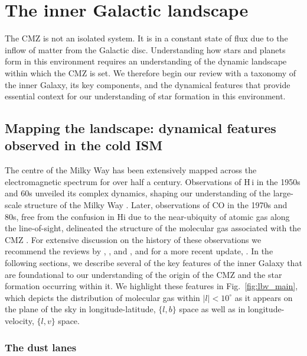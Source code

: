 \section{The inner Galactic landscape} \label{sec:IG}

The CMZ is not an isolated system. It is in a constant state of flux due to the inflow of matter from the Galactic disc. Understanding how stars and planets form in this environment requires an understanding of the dynamic landscape within which the CMZ is set. We therefore begin our review with a taxonomy of the inner Galaxy, its key components, and the dynamical features that provide essential context for our understanding of star formation in this environment. 

\subsection{Mapping the landscape: dynamical features observed in the cold ISM} \label{sec:cartography}

The centre of the Milky Way has been extensively mapped across the electromagnetic spectrum for over half a century. Observations of H\,{\sc i} in the 1950s and 60s unveiled its complex dynamics, shaping our understanding of the large-scale structure of the Milky Way \citep[e.g.][]{Oort1958,Rougoor1960,deVaucouleurs1964}. Later, observations of CO in the 1970s and 80s, free from the confusion in H{\sc i} due to the near-ubiquity of atomic gas along the line-of-sight, delineated the structure of the molecular gas associated with the CMZ \citep{Bania1977, Liszt1978, Bally1987}. For extensive discussion on the history of these observations we recommend the reviews by \citet{Oort1977}, \cite{Combes1991}, and \citet{Morris1996}, and for a more recent update, \citet{Bryant2021}. In the following sections, we describe several of the key features of the inner Galaxy that are foundational to our understanding of the origin of the CMZ and the star formation occurring within it. We highlight these features in Fig.~\ref{fig:lbv_main}, which depicts the distribution of molecular gas within  $|l|<10^{\circ}$ as it appears on the plane of the sky in longitude-latitude, $\{l,b\}$ space as well as in longitude-velocity, $\{l,v\}$ space.

\subsubsection{The dust lanes}\label{sec:dustlanes}

